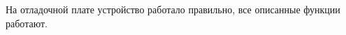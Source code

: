 \begin{sloppypar}
На отладочной плате устройство работало правильно, все описанные функции работают.









\end{sloppypar}
